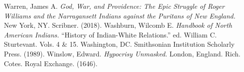 \documentclass[11pt]{article}
\begin{document}
\begin{thebibliography}{1}
\smallskip
{} Warren, James A. {\em God, War, and Providence: The Epic Struggle of Roger Williams and the Narragansett Indians against the Puritans of New England.}  New York, NY. Scribner. (2018).
\smallskip
{} Washburn, Wilcomb E. {\em Handbook of North American Indians.} ``History of Indian-White Relations.'' ed. William C. Sturtevant. Vols. 4 \& 15. Washington, DC. Smithsonian Institution Scholarly Press. (1989).
\smallskip
{} Winslow, Edward. {\em Hypocrisy Unmasked.}  London, England. Rich. Cotes. Royal Exchange. (1646).

\end{thebibliography}











\pagebreak
\appendix
\end{document}
